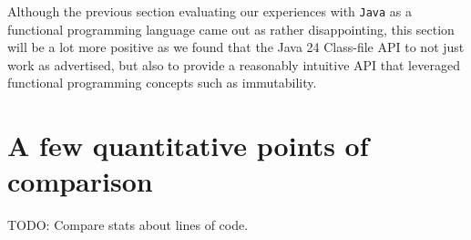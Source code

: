 Although the previous section evaluating our experiences with \texttt{Java} as a functional programming language came out as rather disappointing,
this section will be a lot more positive as we found that the Java 24 Class-file API to not just work as advertised, but also to provide a
reasonably intuitive API that leveraged functional programming concepts such as immutability.

\section{A few quantitative points of comparison}

TODO: Compare stats about lines of code.
